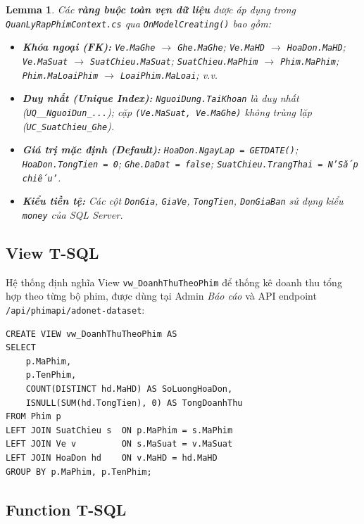 \documentclass[12pt,a4paper,oneside]{book}
\theoremstyle{plain}
\newtheorem{lem}[thm]{Lemma}
\numberwithin{equation}{chapter}
\begin{document}
\begin{lem}\label{lem1}
    Các \textbf{ràng buộc toàn vẹn dữ liệu} được áp dụng trong \texttt{QuanLyRapPhimContext.cs} qua \texttt{OnModelCreating()} bao gồm:
    \begin{itemize}
        \item \textbf{Khóa ngoại (FK):} \texttt{Ve.MaGhe} $\to$ \texttt{Ghe.MaGhe}; \texttt{Ve.MaHD} $\to$ \texttt{HoaDon.MaHD}; \texttt{Ve.MaSuat} $\to$ \texttt{SuatChieu.MaSuat}; \texttt{SuatChieu.MaPhim} $\to$ \texttt{Phim.MaPhim}; \texttt{Phim.MaLoaiPhim} $\to$ \texttt{LoaiPhim.MaLoai}; v.v.
        \item \textbf{Duy nhất (Unique Index):} \texttt{NguoiDung.TaiKhoan} là duy nhất (\texttt{UQ\_\_NguoiDun\_...}); cặp \texttt{(Ve.MaSuat, Ve.MaGhe)} không trùng lặp (\texttt{UC\_SuatChieu\_Ghe}).
        \item \textbf{Giá trị mặc định (Default):} \texttt{HoaDon.NgayLap = GETDATE()}; \texttt{HoaDon.TongTien = 0}; \texttt{Ghe.DaDat = false}; \texttt{SuatChieu.TrangThai = N'Sắp chiếu'}.
        \item \textbf{Kiểu tiền tệ:} Các cột \texttt{DonGia}, \texttt{GiaVe}, \texttt{TongTien}, \texttt{DonGiaBan} sử dụng kiểu \texttt{money} của SQL Server.
    \end{itemize}
\end{lem}

\vspace{0.5cm}

\subsection{View T-SQL}

\noindent Hệ thống định nghĩa View \texttt{vw\_DoanhThuTheoPhim} để thống kê doanh thu tổng hợp theo từng bộ phim, được dùng tại Admin \textit{Báo cáo} và API endpoint \texttt{/api/phimapi/adonet-dataset}:

\begin{lstlisting}[style=sqlstyle, caption={View thống kê doanh thu theo phim (\texttt{vw\_DoanhThuTheoPhim})}]
CREATE VIEW vw_DoanhThuTheoPhim AS
SELECT 
    p.MaPhim,
    p.TenPhim,
    COUNT(DISTINCT hd.MaHD) AS SoLuongHoaDon,
    ISNULL(SUM(hd.TongTien), 0) AS TongDoanhThu
FROM Phim p
LEFT JOIN SuatChieu s  ON p.MaPhim = s.MaPhim
LEFT JOIN Ve v         ON s.MaSuat = v.MaSuat
LEFT JOIN HoaDon hd    ON v.MaHD = hd.MaHD
GROUP BY p.MaPhim, p.TenPhim;
\end{lstlisting}

\subsection{Function T-SQL}
\end{document}
